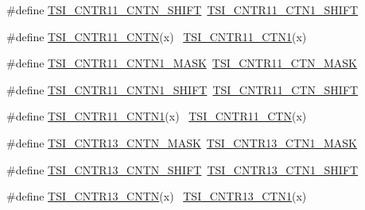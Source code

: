 \begin{DoxyCompactItemize}
\item 
\#define \hyperlink{group___backward___compatibility___symbols_ga17d09220024c6e9ec5fa0d65c0dc2d93}{T\+S\+I\+\_\+\+C\+N\+T\+R11\+\_\+\+C\+N\+T\+N\+\_\+\+S\+H\+I\+FT}~\hyperlink{group___t_s_i___register___masks_gad389afd656e4be5c3a0d57d32a401db5}{T\+S\+I\+\_\+\+C\+N\+T\+R11\+\_\+\+C\+T\+N1\+\_\+\+S\+H\+I\+FT}
\item 
\#define \hyperlink{group___backward___compatibility___symbols_ga7e4353ff70a47b0d7d54419e9b330f45}{T\+S\+I\+\_\+\+C\+N\+T\+R11\+\_\+\+C\+N\+TN}(x)                                          ~\hyperlink{group___t_s_i___register___masks_ga5603c5277384add87a5972f0b2360395}{T\+S\+I\+\_\+\+C\+N\+T\+R11\+\_\+\+C\+T\+N1}(x)
\item 
\#define \hyperlink{group___backward___compatibility___symbols_ga944fe6d1fcc4ed6010b2ea748b5f49a5}{T\+S\+I\+\_\+\+C\+N\+T\+R11\+\_\+\+C\+N\+T\+N1\+\_\+\+M\+A\+SK}~\hyperlink{group___t_s_i___register___masks_ga12ceb148771123d3f985c95857174665}{T\+S\+I\+\_\+\+C\+N\+T\+R11\+\_\+\+C\+T\+N\+\_\+\+M\+A\+SK}
\item 
\#define \hyperlink{group___backward___compatibility___symbols_ga6e6a6f6cfc732480fe839a07abe8af42}{T\+S\+I\+\_\+\+C\+N\+T\+R11\+\_\+\+C\+N\+T\+N1\+\_\+\+S\+H\+I\+FT}~\hyperlink{group___t_s_i___register___masks_ga72c3ce0896c8ead8cf9cb28dc3bbf082}{T\+S\+I\+\_\+\+C\+N\+T\+R11\+\_\+\+C\+T\+N\+\_\+\+S\+H\+I\+FT}
\item 
\#define \hyperlink{group___backward___compatibility___symbols_gab8529b8d9d68f09a92b42ec47008da5d}{T\+S\+I\+\_\+\+C\+N\+T\+R11\+\_\+\+C\+N\+T\+N1}(x)                                        ~\hyperlink{group___t_s_i___register___masks_ga1a9e70bef0e36f21e2432aef2cc97fc7}{T\+S\+I\+\_\+\+C\+N\+T\+R11\+\_\+\+C\+TN}(x)
\item 
\#define \hyperlink{group___backward___compatibility___symbols_ga225dcc41c24002a47e623a46d5d062b8}{T\+S\+I\+\_\+\+C\+N\+T\+R13\+\_\+\+C\+N\+T\+N\+\_\+\+M\+A\+SK}~\hyperlink{group___t_s_i___register___masks_ga9671deb8a78c5ef99068b0244f19f125}{T\+S\+I\+\_\+\+C\+N\+T\+R13\+\_\+\+C\+T\+N1\+\_\+\+M\+A\+SK}
\item 
\#define \hyperlink{group___backward___compatibility___symbols_ga057c043bd52f646e26b4887c50618c2c}{T\+S\+I\+\_\+\+C\+N\+T\+R13\+\_\+\+C\+N\+T\+N\+\_\+\+S\+H\+I\+FT}~\hyperlink{group___t_s_i___register___masks_gad19e50775ced3a5322d93b67c6019536}{T\+S\+I\+\_\+\+C\+N\+T\+R13\+\_\+\+C\+T\+N1\+\_\+\+S\+H\+I\+FT}
\item 
\#define \hyperlink{group___backward___compatibility___symbols_gadafa7f982d1004d45c664ef93483f952}{T\+S\+I\+\_\+\+C\+N\+T\+R13\+\_\+\+C\+N\+TN}(x)                                          ~\hyperlink{group___t_s_i___register___masks_ga303046b18a5643a3d2c41c7285e0efa7}{T\+S\+I\+\_\+\+C\+N\+T\+R13\+\_\+\+C\+T\+N1}(x)

\end{DoxyCompactItemize}
